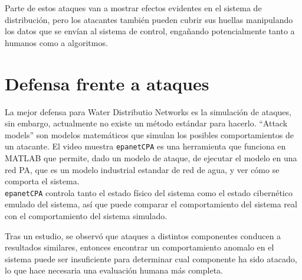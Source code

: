 Parte de estos ataques van a mostrar efectos evidentes en el sistema de distribución, pero los atacantes también pueden cubrir sus huellas manipulando los datos que se envían al sistema de control, engañando potencialmente tanto a humanos como a algoritmos.

\section{Defensa frente a ataques}
La mejor defensa para Water Distributio Networks es la simulación de ataques, sin embargo, actualmente no existe un método estándar para hacerlo.
``Attack models'' son modelos matemáticos que simulan los posibles comportamientos de un atacante.
El video muestra \texttt{epanetCPA} es una herramienta que funciona en MATLAB que permite, dado un modelo de ataque, de ejecutar el modelo en una red PA, que es un modelo industrial estandar de red de agua, y ver cómo se comporta el sistema.\\
\texttt{epanetCPA} controla tanto el estado físico del sistema como el estado cibernético emulado del sistema, así que puede comparar el comportamiento del sistema real con el comportamiento del sistema simulado.

Tras un estudio, se observó que ataques a distintos componentes conducen a resultados similares, entonces encontrar un comportamiento anomalo en el sistema puede ser insuficiente para determinar cual componente ha sido atacado, lo que hace necesaria una evaluación humana más completa.